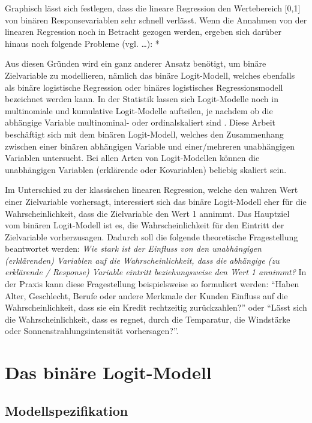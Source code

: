 \documentclass[12pt,]{article}
\begin{document}
Graphisch lässt sich festlegen, dass die lineare Regression den
Wertebereich {[}0,1{]} von binären Responsevariablen sehr schnell
verlässt. Wenn die Annahmen von der linearen Regression noch in Betracht
gezogen werden, ergeben sich darüber hinaus noch folgende Probleme (vgl.
\ldots{}): \emph{ } *

Aus diesen Gründen wird ein ganz anderer Ansatz benötigt, um binäre
Zielvariable zu modellieren, nämlich das binäre Logit-Modell, welches
ebenfalls als binäre logistische Regression oder binäres logistisches
Regressionsmodell bezeichnet werden kann. In der Statistik lassen sich
Logit-Modelle noch in multinomiale und kumulative Logit-Modelle
aufteilen, je nachdem ob die abhängige Variable multinominal- oder
ordinalskaliert sind . Diese Arbeit beschäftigt sich mit dem binären
Logit-Modell, welches den Zusammenhang zwischen einer binären abhängigen
Variable und einer/mehreren unabhängigen Variablen untersucht. Bei allen
Arten von Logit-Modellen können die unabhängigen Variablen (erklärende
oder Kovariablen) beliebig skaliert sein.

Im Unterschied zu der klassischen linearen Regression, welche den wahren
Wert einer Zielvariable vorhersagt, interessiert sich das binäre
Logit-Modell eher für die Wahrscheinlichkeit, dass die Zielvariable den
Wert 1 annimmt. Das Hauptziel vom binären Logit-Modell ist es, die
Wahrscheinlichkeit für den Eintritt der Zielvariable vorherzusagen.
Dadurch soll die folgende theoretische Fragestellung beantwortet werden:
\emph{Wie stark ist der Einfluss von den unabhängigen (erklärenden)
Variablen auf die Wahrscheinlichkeit, dass die abhängige (zu erklärende
/ Response) Variable eintritt beziehungsweise den Wert 1 annimmt?} In
der Praxis kann diese Fragestellung beispielsweise so formuliert werden:
``Haben Alter, Geschlecht, Berufe oder andere Merkmale der Kunden
Einfluss auf die Wahrscheinlichkeit, dass sie ein Kredit rechtzeitig
zurückzahlen?'' oder ``Lässt sich die Wahrscheinlichkeit, dass es
regnet, durch die Temparatur, die Windstärke oder
Sonnenstrahlungsintensität vorhersagen?''.

\section{Das binäre Logit-Modell}\label{das-binare-logit-modell}

\subsection{Modellspezifikation}\label{modellspezifikation}
\end{document}
